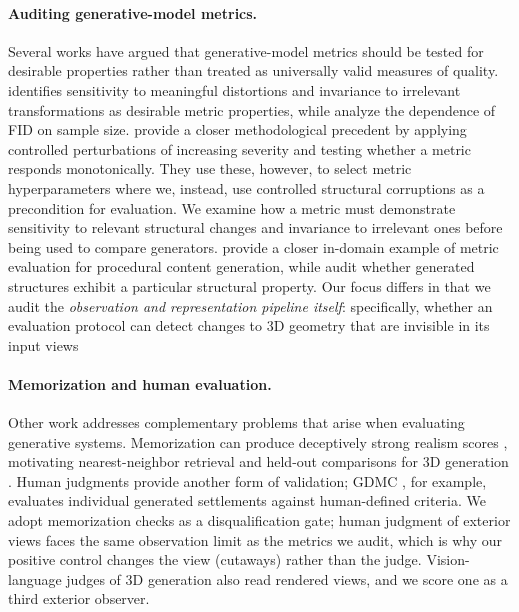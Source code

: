 \paragraph{Auditing generative-model metrics.} Several works have argued that generative-model metrics should be tested for desirable properties rather than treated as universally valid measures of quality. \citet{borji2019prosandcons} identifies sensitivity to meaningful distortions and invariance to irrelevant transformations as desirable metric properties, while \citet{chong2020unbiasedfid} analyze the dependence of FID on sample size. 
\citet{obray2022graphmetrics} provide a closer methodological precedent by applying controlled perturbations of increasing severity and testing whether a metric responds monotonically. They use these, however, to select metric hyperparameters where we, instead, use controlled structural corruptions as a precondition for evaluation. We examine how a metric must demonstrate sensitivity to relevant structural changes and invariance to irrelevant ones before being used to compare generators. \citet{herve2021pcgmetrics} provide a closer in-domain example of metric evaluation for procedural content generation, while \citet{caytuiro2025symmetry} audit whether generated structures exhibit a particular structural property. Our focus differs in that we audit the \emph{observation and representation pipeline itself}: specifically, whether an evaluation protocol can detect changes to 3D geometry that are invisible in its input views


\paragraph{Memorization and human evaluation.} Other work addresses complementary problems that arise when evaluating generative systems. Memorization can produce deceptively strong realism scores \citep{carlini2023extracting,bai2021gamedfid}, motivating nearest-neighbor retrieval and held-out comparisons for 3D generation \citep{pu2025memorization,meehan2020datacopying}. Human judgments provide another form of validation; GDMC \citep{salge2018gdmc}, for example, evaluates individual generated settlements against human-defined criteria. We adopt memorization checks as a disqualification gate; human judgment of exterior views faces the same observation limit as the metrics we audit, which is why our positive control changes the view (cutaways) rather than the judge. Vision-language judges of 3D generation \citep{wu2024gpteval3d} also read rendered views, and we score one as a third exterior observer.

